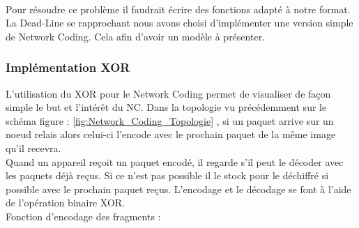         \paragraph{}Pour résoudre ce problème il faudrait écrire des fonctions adapté à notre format. La Dead-Line se rapprochant nous avons choisi d'implémenter une version simple de Network Coding. Cela afin d'avoir un modèle à présenter.
        
        \subsubsection{Implémentation XOR}
        
        L'utilisation du XOR pour le Network Coding permet de visualiser de façon simple le but et l'intérêt du NC.
        Dans la topologie vu précédemment sur le schéma figure : \ref{fig:Network_Coding_Topologie}  , si un paquet arrive sur un noeud relais alors celui-ci l'encode avec le prochain paquet de la même image qu'il recevra.\\
        Quand un appareil reçoit un paquet encodé, il regarde s'il peut le décoder avec les paquets déjà reçus.
        Si ce n'est pas possible il le stock pour le déchiffré si possible avec le prochain paquet reçus.
        L'encodage et le décodage se font à l'aide de l'opération binaire XOR.\\
        
        Fonction d'encodage des fragments :
        
